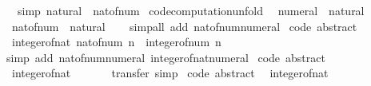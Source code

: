 \begin{isabellebody}
\ \ \ {\isacharbrackleft}simp{\isacharbrackright}{\isacharcolon}\ {\isachardoublequoteopen}natural\ {\isacharequal}\ nat{\isacharunderscore}of{\isacharunderscore}num{\isachardoublequoteclose}\isanewline
\isanewline
{}\isamarkupfalse%
\ {\isacharbrackleft}code{\isacharunderscore}computation{\isacharunderscore}unfold{\isacharbrackright}{\isacharcolon}\isanewline
\ \ {\isachardoublequoteopen}numeral\ {\isacharequal}\ natural{\isachardoublequoteclose}\isanewline
\ \ {\isachardoublequoteopen}nat{\isacharunderscore}of{\isacharunderscore}num\ {\isacharequal}\ natural{\isachardoublequoteclose}\isanewline
%
\isadelimproof
\ \ %
\endisadelimproof
%
\isatagproof
{}\isamarkupfalse%
\ {\isacharparenleft}simp{\isacharunderscore}all\ add{\isacharcolon}\ nat{\isacharunderscore}of{\isacharunderscore}num{\isacharunderscore}numeral{\isacharparenright}%
\endisatagproof
{\isafoldproof}%
%
\isadelimproof
\isanewline
%
\endisadelimproof
\isanewline
{}\isamarkupfalse%
\isanewline
\isanewline
{}\isamarkupfalse%
\ {\isacharbrackleft}code\ abstract{\isacharbrackright}{\isacharcolon}\isanewline
\ \ {\isachardoublequoteopen}integer{\isacharunderscore}of{\isacharunderscore}nat\ {\isacharparenleft}nat{\isacharunderscore}of{\isacharunderscore}num\ n{\isacharparenright}\ {\isacharequal}\ integer{\isacharunderscore}of{\isacharunderscore}num\ n{\isachardoublequoteclose}\isanewline
%
\isadelimproof
\ \ %
\endisadelimproof
%
\isatagproof
{}\isamarkupfalse%
\ {\isacharparenleft}simp\ add{\isacharcolon}\ nat{\isacharunderscore}of{\isacharunderscore}num{\isacharunderscore}numeral\ integer{\isacharunderscore}of{\isacharunderscore}nat{\isacharunderscore}numeral{\isacharparenright}%
\endisatagproof
{\isafoldproof}%
%
\isadelimproof
\isanewline
%
\endisadelimproof
\isanewline
{}\isamarkupfalse%
\ {\isacharbrackleft}code\ abstract{\isacharbrackright}{\isacharcolon}\isanewline
\ \ {\isachardoublequoteopen}integer{\isacharunderscore}of{\isacharunderscore}nat\ {}\ {\isacharequal}\ {}{\isachardoublequoteclose}\isanewline
%
\isadelimproof
\ \ %
\endisadelimproof
%
\isatagproof
{}\isamarkupfalse%
\ transfer\ simp%
\endisatagproof
{\isafoldproof}%
%
\isadelimproof
\isanewline
%
\endisadelimproof
\isanewline
{}\isamarkupfalse%
\ {\isacharbrackleft}code\ abstract{\isacharbrackright}{\isacharcolon}\isanewline
\ \ {\isachardoublequoteopen}integer{\isacharunderscore}of{\isacharunderscore}nat\ {}\ {\isacharequal}\ {}{\isachardoublequoteclose}\isanewline

\end{isabellebody}
